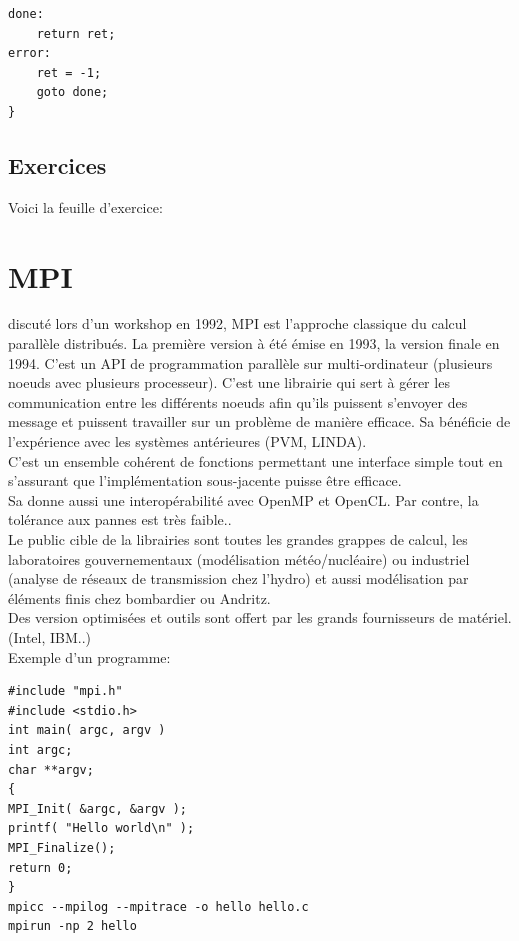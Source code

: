 \documentclass[oneside]{book}
\begin{document}
\begin{lstlisting}
done:
    return ret;
error:
    ret = -1;
    goto done;
}
\end{lstlisting}

\section{Exercices}
Voici la feuille d'exercice:



\chapter{MPI}

discuté lors d'un workshop en 1992, MPI est l'approche classique du calcul parallèle distribués. La première version à été émise en 1993, la version finale en 1994. C'est un API de programmation parallèle sur multi-ordinateur (plusieurs noeuds avec plusieurs processeur). C'est une librairie qui sert à gérer les communication entre les différents noeuds afin qu'ils puissent s'envoyer des message et puissent travailler sur un problème de manière efficace. Sa bénéficie de l'expérience avec les systèmes antérieures (PVM, LINDA). \\

C'est un ensemble cohérent de fonctions permettant une interface simple tout en s'assurant que l'implémentation sous-jacente puisse être efficace. \\

Sa donne aussi une interopérabilité avec OpenMP et OpenCL. Par contre, la tolérance aux pannes est très faible..\\

Le public cible de la librairies sont toutes les grandes grappes de calcul, les laboratoires gouvernementaux (modélisation météo/nucléaire) ou industriel (analyse de réseaux de transmission chez l'hydro) et aussi modélisation par éléments finis chez bombardier ou Andritz.\\

Des version optimisées et outils sont offert par les grands fournisseurs de matériel. (Intel, IBM..)\\

Exemple d'un programme:
\begin{lstlisting}
#include "mpi.h"
#include <stdio.h>
int main( argc, argv )
int argc;
char **argv;
{
MPI_Init( &argc, &argv );
printf( "Hello world\n" );
MPI_Finalize();
return 0;
}
mpicc --mpilog --mpitrace -o hello hello.c
mpirun -np 2 hello
\end{lstlisting}
\end{document}
